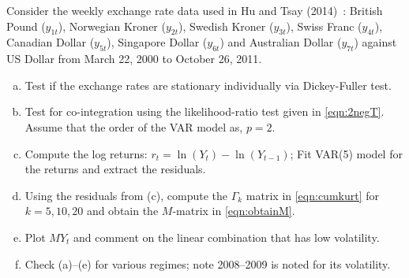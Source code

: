 \prob Consider the weekly exchange rate data used in Hu and Tsay (2014)~\cite{hutsay14}: British Pound ($y_{1t}$), Norwegian Kroner ($y_{2t}$), Swedish Kroner ($y_{3t}$), Swiss Franc ($y_{4t}$), Canadian Dollar ($y_{5t}$), Singapore Dollar ($y_{6t}$) and Australian Dollar ($y_{7t}$) against US Dollar from March 22, 2000 to October 26, 2011.

\begin{enumerate}[(a)]
\item Test if the exchange rates are stationary individually via Dickey-Fuller test.
\item Test for co-integration using the likelihood-ratio test given in \eqref{eqn:2negT}. Assume that the order of the VAR model as, $p= 2$.
\item Compute the log returns: $r_t= \ln(Y_t) - \ln(Y_{t-1})$; Fit VAR(5) model for the returns and extract the residuals. 
\item Using the residuals from (c), compute the $\Gamma_k$ matrix in \eqref{eqn:cumkurt} for $k= 5, 10, 20$ and obtain the $M$-matrix in \eqref{eqn:obtainM}.
\item Plot $MY_t$ and comment on the linear combination that has low volatility. 
\item Check (a)--(e) for various regimes; note 2008--2009 is noted for its volatility. 
\end{enumerate}